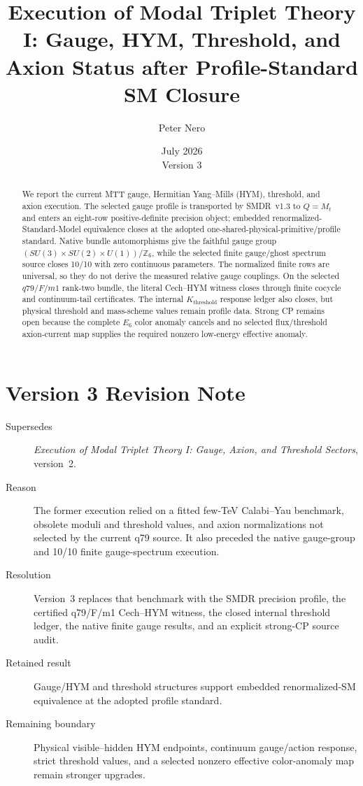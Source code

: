 \documentclass[11pt]{article}
\title{Execution of Modal Triplet Theory I:
Gauge, HYM, Threshold, and Axion Status after Profile-Standard SM Closure}
\author{Peter Nero}
\date{July 2026\\Version 3}
\begin{document}
\maketitle

\begin{abstract}
We report the current MTT gauge, Hermitian Yang--Mills (HYM), threshold, and
axion execution. The selected gauge profile is transported by SMDR~v1.3 to
$Q=M_t$ and enters an eight-row positive-definite precision object; embedded
renormalized-Standard-Model equivalence closes at the adopted
one-shared-physical-primitive/profile standard. Native bundle automorphisms
give the faithful gauge group
$(SU(3)\times SU(2)\times U(1))/\mathbb Z_6$, while the selected finite
gauge/ghost spectrum source closes 10/10 with zero continuous parameters. The
normalized finite rows are universal, so they do not derive the measured
relative gauge couplings. On the selected $q79/F/m1$ rank-two bundle, the
literal Cech--HYM witness closes through finite cocycle and continuum-tail
certificates. The internal $K_{\mathrm{threshold}}$ response ledger also
closes, but physical threshold and mass-scheme values remain profile data.
Strong CP remains open because the complete $E_6$ color anomaly cancels and no
selected flux/threshold axion-current map supplies the required nonzero
low-energy effective anomaly.
\end{abstract}

\section*{Version 3 Revision Note}
\begin{description}
\item[Supersedes] \emph{Execution of Modal Triplet Theory I: Gauge, Axion,
and Threshold Sectors}, version~2.
\item[Reason] The former execution relied on a fitted few-TeV Calabi--Yau
benchmark, obsolete moduli and threshold values, and axion normalizations not
selected by the current q79 source. It also preceded the native gauge-group and
10/10 finite gauge-spectrum execution.
\item[Resolution] Version~3 replaces that benchmark with the SMDR precision
profile, the certified q79/F/m1 Cech--HYM witness, the closed internal threshold
ledger, the native finite gauge results, and an explicit strong-CP source
audit.
\item[Retained result] Gauge/HYM and threshold structures support embedded
renormalized-SM equivalence at the adopted profile standard.
\item[Remaining boundary] Physical visible--hidden HYM endpoints, continuum
gauge/action response, strict threshold values, and a selected nonzero
effective color-anomaly map remain stronger upgrades.
\end{description}
\end{document}
